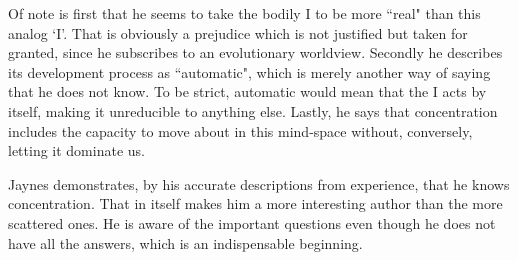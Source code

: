 \begin{footnotesize}
\begin{sffamily}
Of note is first that he seems to take the bodily I to be more ``real" than this analog `I'. That is obviously a prejudice which is not justified but taken for granted, since he subscribes to an evolutionary worldview. Secondly he describes its development process as ``automatic", which is merely another way of saying that he does not know. To be strict, automatic would mean that the I acts by itself, making it unreducible to anything else. Lastly, he says that concentration includes the capacity to move about in this mind-space without, conversely, letting it dominate us. 

Jaynes demonstrates, by his accurate descriptions from experience, that he knows concentration. That in itself makes him a more interesting author than the more scattered ones. He is aware of the important questions even though he does not have all the answers, which is an indispensable beginning.


\end{sffamily}\end{footnotesize}
